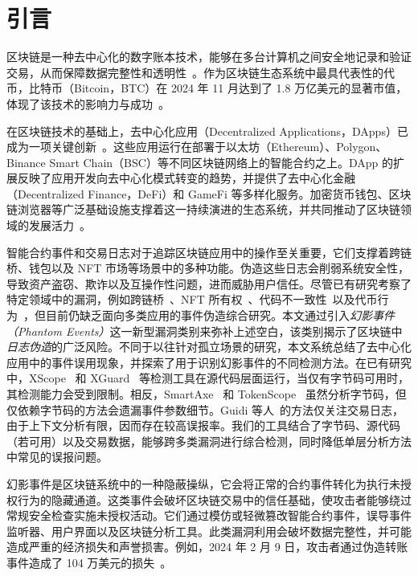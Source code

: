 \section{引言}
\label{Sec:Introduction}

区块链是一种去中心化的数字账本技术，能够在多台计算机之间安全地记录和验证交易，从而保障数据完整性和透明性~\cite{bitcoin}。作为区块链生态系统中最具代表性的代币，比特币（Bitcoin，BTC）在 2024 年 11 月达到了 1.8 万亿美元的显著市值，体现了该技术的影响力与成功~\cite{coinmarketcap}。


在区块链技术的基础上，去中心化应用（Decentralized Applications，DApps）已成为一项关键创新~\cite{buterin2014next}。这些应用运行在部署于以太坊（Ethereum）、Polygon、Binance Smart Chain（BSC）等不同区块链网络上的智能合约之上。DApp 的扩展反映了应用开发向去中心化模式转变的趋势，并提供了去中心化金融（Decentralized Finance，DeFi）和 GameFi 等多样化服务。加密货币钱包、区块链浏览器等广泛基础设施支撑着这一持续演进的生态系统，并共同推动了区块链领域的发展活力~\cite{tang2022blockchain}。

智能合约事件和交易日志对于追踪区块链应用中的操作至关重要，它们支撑着跨链桥、钱包以及 NFT 市场等场景中的多种功能。伪造这些日志会削弱系统安全性，导致资产盗窃、欺诈以及互操作性问题，进而威胁用户信任。尽管已有研究考察了特定领域中的漏洞，例如跨链桥~\cite{Xscope,liao2024smartaxe,wang2024xguard}、NFT 所有权~\cite{sleepminting}、代码不一致性~\cite{doccon}以及代币行为~\cite{TokenScope}，但目前仍缺乏面向多类应用的事件伪造综合研究。本文通过引入\emph{幻影事件（Phantom Events）}这一新型漏洞类别来弥补上述空白，该类别揭示了区块链中\emph{日志伪造}的广泛风险。不同于以往针对孤立场景的研究，本文系统总结了去中心化应用中的事件误用现象，并探索了用于识别幻影事件的不同检测方法。在已有研究中，XScope~\cite{Xscope} 和 XGuard~\cite{wang2024xguard} 等检测工具在源代码层面运行，当仅有字节码可用时，其检测能力会受到限制。相反，SmartAxe~\cite{liao2024smartaxe} 和 TokenScope~\cite{TokenScope} 虽然分析字节码，但仅依赖字节码的方法会遗漏事件参数细节。Guidi 等人~\cite{sleepminting}的方法仅关注交易日志，由于上下文分析有限，因而存在较高误报率。我们的工具结合了字节码、源代码（若可用）以及交易数据，能够跨多类漏洞进行综合检测，同时降低单层分析方法中常见的误报问题。

幻影事件是区块链系统中的一种隐蔽操纵，它会将正常的合约事件转化为执行未授权行为的隐藏通道。这类事件会破坏区块链交易中的信任基础，使攻击者能够绕过常规安全检查实施未授权活动。它们通过模仿或轻微篡改智能合约事件，误导事件监听器、用户界面以及区块链分析工具。此类漏洞利用会破坏数据完整性，并可能造成严重的经济损失和声誉损害。例如，2024 年 2 月 9 日，攻击者通过伪造转账事件造成了 104 万美元的损失~\cite{zero_transfer}。

